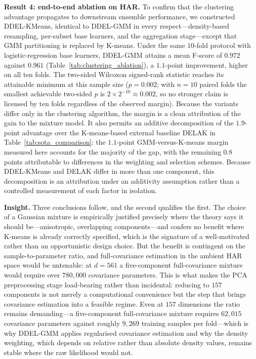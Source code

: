 \documentclass[lettersize,journal]{IEEEtran}
\begin{document}
		\noindent \textbf{Result 4: end-to-end ablation on HAR.} To confirm that the clustering advantage propagates to downstream ensemble performance, we constructed DDEL-KMeans, identical to DDEL-GMM in every respect---density-based resampling, per-subset base learners, and the aggregation stage---except that GMM partitioning is replaced by K-means. Under the same $10$-fold protocol with logistic-regression base learners, DDEL-GMM attains a mean F-score of $0.972$ against $0.961$ (Table~\ref{tab:clustering_ablation}), a $1.1$-point improvement, higher on all ten folds. The two-sided Wilcoxon signed-rank statistic reaches its attainable minimum at this sample size ($p = 0.002$; with $n = 10$ paired folds the smallest achievable two-sided $p$ is $2 \times 2^{-10} \approx 0.002$, so no stronger claim is licensed by ten folds regardless of the observed margin). Because the variants differ only in the clustering algorithm, the margin is a clean attribution of the gain to the mixture model. It also permits an additive decomposition of the $1.9$-point advantage over the K-means-based external baseline DELAK in Table~\ref{tab:sota_comparison}: the $1.1$-point GMM-versus-K-means margin measured here accounts for the majority of the gap, with the remaining $0.8$ points attributable to differences in the weighting and selection schemes. Because DDEL-KMeans and DELAK differ in more than one component, this decomposition is an attribution under an additivity assumption rather than a controlled measurement of each factor in isolation.
		
		\noindent \textbf{Insight.} Three conclusions follow, and the second qualifies the first. The choice of a Gaussian mixture is empirically justified precisely where the theory says it should be---anisotropic, overlapping components---and confers no benefit where K-means is already correctly specified, which is the signature of a well-motivated rather than an opportunistic design choice. But the benefit is contingent on the sample-to-parameter ratio, and full-covariance estimation in the ambient HAR space would be untenable: at $d = 561$ a five-component full-covariance mixture would require over $780{,}000$ covariance parameters. This is what makes the PCA preprocessing stage load-bearing rather than incidental: reducing to $157$ components is not merely a computational convenience but the step that brings covariance estimation into a feasible regime. Even at $157$ dimensions the ratio remains demanding---a five-component full-covariance mixture requires $62{,}015$ covariance parameters against roughly $9{,}269$ training samples per fold---which is why DDEL-GMM applies regularised covariance estimation and why the density weighting, which depends on relative rather than absolute density values, remains stable where the raw likelihood would not.
\end{document}
